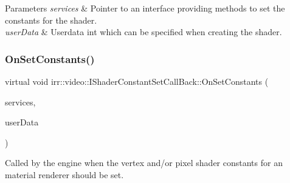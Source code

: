 \begin{DoxyParams}{Parameters}
{\em services} & Pointer to an interface providing methods to set the constants for the shader. \\
\hline
{\em user\+Data} & Userdata int which can be specified when creating the shader. \\
\hline
\end{DoxyParams}
\mbox{\label{classirr_1_1video_1_1IShaderConstantSetCallBack_a91cf4eb8d20d278defaca4e3c9390396}} 
\subsubsection{\texorpdfstring{On\+Set\+Constants()}{OnSetConstants()}\hspace{0.1cm}{\footnotesize\ttfamily [2/2]}}
{\footnotesize\ttfamily virtual void irr\+::video\+::\+I\+Shader\+Constant\+Set\+Call\+Back\+::\+On\+Set\+Constants (\begin{DoxyParamCaption}\item[{\hyperlink{classirr_1_1video_1_1IMaterialRendererServices}{I\+Material\+Renderer\+Services} $\ast$}]{services,  }\item[{\hyperlink{namespaceirr_ac66849b7a6ed16e30ebede579f9b47c6}{s32}}]{user\+Data }\end{DoxyParamCaption})\hspace{0.3cm}{\ttfamily [pure virtual]}}



Called by the engine when the vertex and/or pixel shader constants for an material renderer should be set. 

